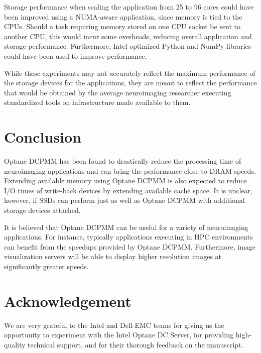 \documentclass[conference]{IEEEtran}
\begin{document}
Storage performance when scaling the application from 25 to 96 cores could have been improved using a
NUMA-aware application, since memory is tied to the CPUs. Should a task requiring memory
stored on one CPU socket be sent to another CPU, this would incur some overheads, reducing overall application
and storage performance. Furthermore, Intel optimized Python and NumPy libraries could have been used to improve 
performance.

While these experiments may not accurately reflect the maximum performance of the storage devices for the applications,
they are meant to reflect the performance that would be obtained by the average neuroimaging researcher
executing standardized tools on infrastructure made available to them.

\section{Conclusion}

Optane DCPMM has been found to drastically reduce the processing time of neuroimaging applications and
can bring the performance close to DRAM speeds. Extending available memory using Optane DCPMM is also 
expected to reduce I/O times of write-back devices by extending available cache space.
It is unclear, however, if SSDs can perform just as well as Optane DCPMM with additional storage devices
attached.

It is believed that Optane DCPMM can be useful for a variety of neuroimaging applications. For
instance, typically applications executing in HPC environments can benefit from 
the speedups provided by Optane DCPMM. Furthermore, image visualization servers will be able
to display higher resolution images at significantly greater speeds.
\section{Acknowledgement}
We are very grateful to the Intel and Dell-EMC teams for giving us the
opportunity to experiment with the Intel Optane DC Server, for providing
high-quality technical support, and for their thorough feedback on the
manuscript. 
 

\end{document}
